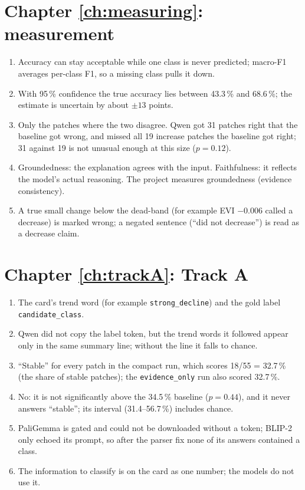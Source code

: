 \section*{Chapter \ref{ch:measuring}: measurement}
\begin{enumerate}
  \item Accuracy can stay acceptable while one class is never predicted; macro-F1 averages per-class F1, so a missing class pulls it down.
  \item With 95\,\% confidence the true accuracy lies between 43.3\,\% and 68.6\,\%; the estimate is uncertain by about $\pm13$ points.
  \item Only the patches where the two disagree. Qwen got 31 patches right that the baseline got wrong, and missed all 19 increase patches the baseline got right; 31 against 19 is not unusual enough at this size ($p = 0.12$).
  \item Groundedness: the explanation agrees with the input. Faithfulness: it reflects the model's actual reasoning. The project measures groundedness (evidence consistency).
  \item A true small change below the dead-band (for example EVI $-0.006$ called a decrease) is marked wrong; a negated sentence (``did not decrease'') is read as a decrease claim.
\end{enumerate}

\section*{Chapter \ref{ch:trackA}: Track A}
\begin{enumerate}
  \item The card's trend word (for example \texttt{strong\_decline}) and the gold label \texttt{candidate\_class}.
  \item Qwen did not copy the label token, but the trend words it followed appear only in the same summary line; without the line it falls to chance.
  \item ``Stable'' for every patch in the compact run, which scores 18/55 = 32.7\,\% (the share of stable patches); the \texttt{evidence\_only} run also scored 32.7\,\%.
  \item No: it is not significantly above the 34.5\,\% baseline ($p = 0.44$), and it never answers ``stable''; its interval (31.4--56.7\,\%) includes chance.
  \item PaliGemma is gated and could not be downloaded without a token; BLIP-2 only echoed its prompt, so after the parser fix none of its answers contained a class.
  \item The information to classify is on the card as one number; the models do not use it.
\end{enumerate}

